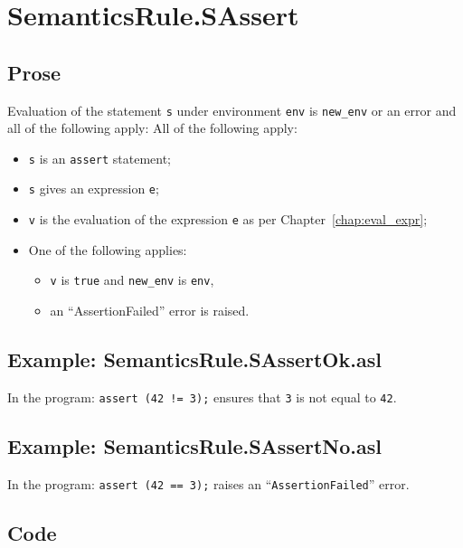 \documentclass{book}
\begin{document}
\section{SemanticsRule.SAssert \label{sec:SemanticsRule.SAssert}}

    \subsection{Prose}
  Evaluation of the statement \texttt{s} under environment \texttt{env} is
\texttt{new\_env} or an error and all of the following apply:
    All of the following apply:
    \begin{itemize}
    \item \texttt{s} is an \texttt{assert} statement;
    \item \texttt{s} gives an expression \texttt{e};
    \item \texttt{v} is the evaluation of the expression \texttt{e} as per Chapter~\ref{chap:eval_expr};
    \item One of the following applies:
          \begin{itemize}
          \item \texttt{v} is \texttt{true} and \texttt{new\_env} is \texttt{env},
          \item an ``AssertionFailed'' error is raised.
          \end{itemize}
    \end{itemize}

    \subsection{Example: SemanticsRule.SAssertOk.asl}
    In the program:
    \texttt{assert (42 != 3);} ensures that \texttt{3} is not equal to \texttt{42}.

    \subsection{Example: SemanticsRule.SAssertNo.asl}
    In the program:
    \texttt{assert (42 == 3);} raises an ``\texttt{AssertionFailed}'' error.

  \subsection{Code}
\end{document}
